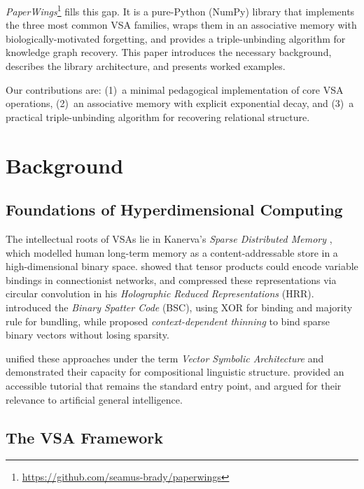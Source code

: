 \documentclass[11pt]{article}
\begin{document}
\textit{PaperWings}\footnote{\url{https://github.com/seamus-brady/paperwings}} fills this gap. It is a pure-Python (NumPy) library that implements the three most common VSA families, wraps them in an associative memory with biologically-motivated forgetting, and provides a triple-unbinding algorithm for knowledge graph recovery. This paper introduces the necessary background, describes the library architecture, and presents worked examples.

Our contributions are: (1)~a minimal pedagogical implementation of core VSA operations, (2)~an associative memory with explicit exponential decay, and (3)~a practical triple-unbinding algorithm for recovering relational structure.

\section{Background}

\subsection{Foundations of Hyperdimensional Computing}

The intellectual roots of VSAs lie in Kanerva's \textit{Sparse Distributed Memory} \citep{kanerva1988}, which modelled human long-term memory as a content-addressable store in a high-dimensional binary space. \citet{smolensky1990} showed that tensor products could encode variable bindings in connectionist networks, and \citet{plate1995} compressed these representations via circular convolution in his \textit{Holographic Reduced Representations} (HRR). \citet{kanerva1997} introduced the \textit{Binary Spatter Code} (BSC), using XOR for binding and majority rule for bundling, while \citet{rachkovskij2001} proposed \textit{context-dependent thinning} to bind sparse binary vectors without losing sparsity.

\citet{gayler2003} unified these approaches under the term \textit{Vector Symbolic Architecture} and demonstrated their capacity for compositional linguistic structure. \citet{kanerva2009} provided an accessible tutorial that remains the standard entry point, and \citet{levy2008} argued for their relevance to artificial general intelligence.

\subsection{The VSA Framework}
\end{document}

